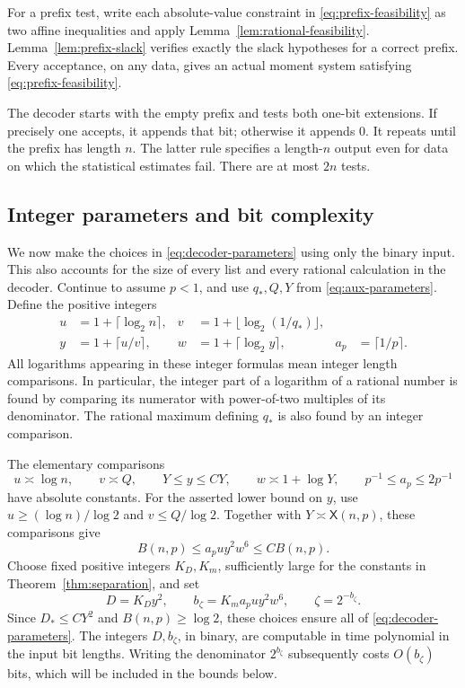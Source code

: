 For a prefix test, write each absolute-value constraint in
\eqref{eq:prefix-feasibility} as two affine inequalities and apply
Lemma~\ref{lem:rational-feasibility}.  Lemma~\ref{lem:prefix-slack}
verifies exactly the slack hypotheses for a correct prefix.  Every
acceptance, on any data, gives an actual moment system satisfying
\eqref{eq:prefix-feasibility}.

The decoder starts with the empty prefix and tests both one-bit
extensions.  If precisely one accepts, it appends that bit; otherwise
it appends \(0\).  It repeats until the prefix has length \(n\).
The latter rule specifies a length-\(n\) output even for data on which
the statistical estimates fail.  There are at most \(2n\) tests.

\subsection{Integer parameters and bit complexity}

We now make the choices in \eqref{eq:decoder-parameters} using only
the binary input.  This also accounts for the size of every list and
every rational calculation in the decoder.  Continue to assume
\(p<1\), and use \(q_*,Q,Y\) from \eqref{eq:aux-parameters}.  Define
the positive integers
\begin{align*}
 u&=1+\lceil\log_2 n\rceil,
 &v&=1+\lfloor\log_2(1/q_*)\rfloor,\\
 y&=1+\lceil u/v\rceil,
 &w&=1+\lceil\log_2 y\rceil,
 &a_p&=\lceil1/p\rceil.
\end{align*}
All logarithms appearing in these integer formulas mean integer
length comparisons.  In particular, the integer part of a logarithm
of a rational number is found by comparing its numerator with
power-of-two multiples of its denominator.  The rational maximum
defining \(q_*\) is also found by an integer comparison.

The elementary comparisons
\[
 u\asymp\log n,\qquad v\asymp Q,\qquad
 Y\le y\le C Y,\qquad
 w\asymp1+\log Y,\qquad p^{-1}\le a_p\le2p^{-1}
\]
have absolute constants.  For the asserted lower bound on \(y\),
use \(u\ge(\log n)/\log2\) and \(v\le Q/\log2\).
Together with \(Y\asymp\mathsf X(n,p)\), these comparisons give
\begin{equation}\label{eq:integer-budget-proxy}
 B(n,p)\le a_pu y^2w^6\le C B(n,p).
\end{equation}
Choose fixed positive integers \(K_D,K_m\), sufficiently large for
the constants in Theorem~\ref{thm:separation}, and set
\begin{equation}\label{eq:integer-decoder-parameters}
 D=K_Dy^2,\qquad b_\zeta=K_m a_pu y^2w^6,\qquad
 \zeta=2^{-b_\zeta}.
\end{equation}
Since \(D_*\le C Y^2\) and \(B(n,p)\ge\log2\), these choices ensure
all of \eqref{eq:decoder-parameters}.  The integers \(D,b_\zeta\), in binary,
are computable in time polynomial in the input bit lengths.  Writing
the denominator \(2^{b_\zeta}\) subsequently costs \(O(b_\zeta)\) bits, which will
be included in the bounds below.

